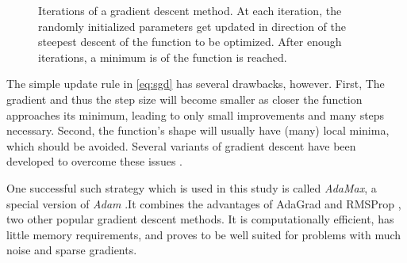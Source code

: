 \begin{figure}[H]
    \label{fig:sgd}
    \centering
    

    \caption[Gradient descent]{Iterations of a gradient descent method. At each iteration, the randomly initialized parameters get updated in 
    direction of the steepest descent of the function to be optimized. After enough iterations, a minimum is of the function is reached.}
\end{figure}

The simple update rule in \ref{eq:sgd} has several drawbacks, however. First, The gradient and thus the step size will become smaller as closer the function approaches its minimum, leading to only small improvements and many steps necessary.
Second, the function's shape will usually have (many) local minima, which should be avoided.
Several variants of gradient descent have been developed to overcome these issues \cite{ruder2016overview}.

One successful such strategy which is used in this study is called \textit{AdaMax}, a special version 
of \textit{Adam} \cite{kingma2014adam}.It combines the advantages of AdaGrad \cite{duchi2011adaptive} and RMSProp \cite{bengio2015rmsprop},
two other popular gradient descent methods. It is computationally efficient, has little
memory requirements, and proves to be well suited for problems with much noise and sparse gradients.

